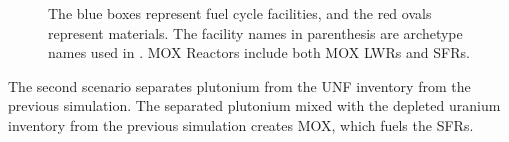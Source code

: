 \begin{figure}
{
        
                }
                \caption{The blue boxes represent fuel cycle facilities, and the red ovals
	                	 represent materials. The facility names in parenthesis are archetype names
	                	 used in \Cyclus. \gls{MOX} Reactors include both \gls{MOX} \glspl{LWR} and
	                	 \glspl{SFR}.}
                \label{diag:fc}
\end{figure}


The second scenario separates plutonium from the \gls{UNF}
inventory from the previous simulation. The separated
plutonium mixed with the depleted uranium inventory from the previous simulation
creates \gls{MOX}, which fuels the \gls{SFR}s. 
